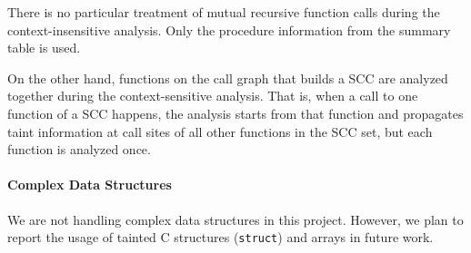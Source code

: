 There is no particular treatment of mutual recursive function
calls during the context-insensitive analysis. Only the
procedure information from the summary table is used.

On the other hand, functions on the call graph that builds a
SCC are analyzed together during the context-sensitive analysis.
That is, when a call to one function of a SCC happens,
the analysis starts from that function and propagates taint
information at call sites of all other functions in the SCC set,
but each function is analyzed once.

\paragraph{Complex Data Structures}

We are not handling complex data structures in this project.
However, we plan to report the usage of tainted C structures
(\texttt{struct}) and arrays in future work.